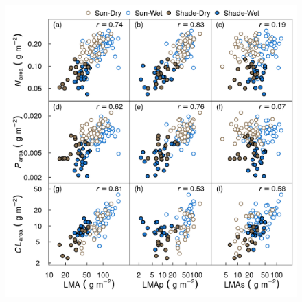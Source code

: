 \documentclass[
  12pt,
  a4paper,
,tablecaptionabove
]{scrartcl}
\providecommand{\DIFaddbeginFL}{} %
\providecommand{\DIFdelbeginFL}{} %
\providecommand{\DIFdelendFL}{} %
\newcommand{\DIFscaledelfig}{0.5}
\newlength{\DIFdelgraphicswidth} %
\newlength{\DIFdelgraphicsheight} %
\newcommand{\DIFaddincludegraphics}[2][]{{\color{blue}\fbox{\DIFOincludegraphics[#1]{#2}}}} %
\newcommand{\DIFdelincludegraphics}[2][]{%
\sbox{\DIFdelgraphicsbox}{\DIFOincludegraphics[#1]{#2}}%
\settoboxwidth{\DIFdelgraphicswidth}{\DIFdelgraphicsbox} %
\settoboxtotalheight{\DIFdelgraphicsheight}{\DIFdelgraphicsbox} %
\scalebox{\DIFscaledelfig}{%
\parbox[b]{\DIFdelgraphicswidth}{\usebox{\DIFdelgraphicsbox}\\[-\baselineskip] \rule{\DIFdelgraphicswidth}{0em}}\llap{\resizebox{\DIFdelgraphicswidth}{\DIFdelgraphicsheight}{%
\setlength{\unitlength}{\DIFdelgraphicswidth}%
\begin{picture}(1,1)%
\thicklines\linethickness{2pt} %
{\color[rgb]{1,0,0}\put(0,0){\framebox(1,1){}}}%
{\color[rgb]{1,0,0}\put(0,0){\line( 1,1){1}}}%
{\color[rgb]{1,0,0}\put(0,1){\line(1,-1){1}}}%
\end{picture}%
}\hspace*{3pt}}} %
} %
\DeclareRobustCommand{\DIFaddbeginFL}{\DIFOaddbeginFL \let\includegraphics\DIFaddincludegraphics} %
\DeclareRobustCommand{\DIFdelbeginFL}{\DIFOdelbeginFL \let\includegraphics\DIFdelincludegraphics} %
\DeclareRobustCommand{\DIFdelendFL}{\DIFOaddendFL \let\includegraphics\DIFOincludegraphics} %
\begin{document}
\begin{figure}
\DIFdelbeginFL %
\DIFdelendFL \DIFaddbeginFL

{\centering \includegraphics{../figs/pa_point_npc.png}

}
\end{figure}
\end{document}
